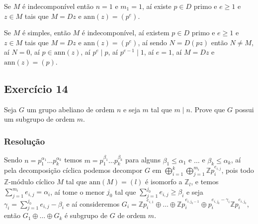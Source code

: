 \documentclass[10pt,a4paper]{article}
\begin{document}
\medskip
\noindent
Se $M$ é indecomponível então $n=1$ e $m_1=1$, aí existe $p\in D$ primo e $e\geq 1$ e $z\in M$ tais que $M=Dz$ e $\mathrm{ann}(z)=(p^e)$.

\medskip
\noindent
Se $M$ é simples, então $M$ é indecomponível, aí existem $p\in D$ primo e $e\geq 1$ e $z\in M$ tais que $M=Dz$ e $\mathrm{ann}(z)=(p^e)$, aí sendo $N=D(pz)$ então $N\neq M$, aí $N=0$, aí $p\in\mathrm{ann}(z)$, aí $p^e\mid p$, aí $p^{e-1}\mid 1$, aí $e=1$, aí $M=Dz$ e $\mathrm{ann}(z)=(p)$.

\subsection*{Exercício 14}

Seja $G$ um grupo abeliano de ordem $n$ e seja $m$ tal que $m\mid n$. Prove que $G$ possui um subgrupo de ordem $m$.

\subsubsection*{Resolução}

Sendo $n=p_1^{\alpha_1}\dots p_k^{\alpha_k}$ temos $m=p_1^{\beta_1}\dots p_k^{\beta_k}$ para alguns $\beta_1\leq\alpha_1$ e $\dots$ e $\beta_k\leq\alpha_k$, aí pela decomposição cíclica podemos decompor $G$ em $\bigoplus_{i=1}^k\bigoplus_{j=1}^{m_i}\mathbb{Z}p_i^{e_{i,j}}$, pois todo $\mathbb{Z}$-módulo cíclico $M$ tal que $\mathrm{ann}(M)=(l)$ é isomorfo a $\mathbb{Z}_l$, e temos $\sum_{j=1}^{m_i}e_{i,j}=\alpha_i$, aí tome o menor $j_0$ tal que $\sum_{j=1}^{j_0}e_{i,j}\geq\beta_i$ e seja $\gamma_i=\sum_{j=1}^{j_0}e_{i,j}-\beta_i$ e aí consideremos $G_i=\mathbb{Z}p_i^{e_{i,1}}\oplus\dots\oplus\mathbb{Z}p_i^{e_{i,j_0-1}}\oplus p_i^{e_{i,j_0}-\gamma_i}\mathbb{Z}p_i^{e_{i,j_0}}$, então $G_1\oplus\dots\oplus G_k$ é subgrupo de $G$ de ordem $m$.
\end{document}
